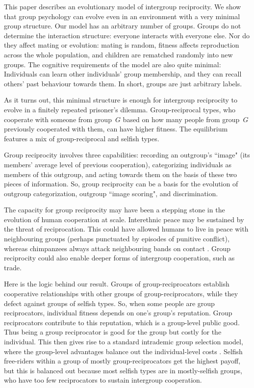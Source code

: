 \documentclass[12pt,a4paper]{article}
\begin{document}
This paper describes an evolutionary model of intergroup reciprocity. We show that group psychology can evolve even in an environment with a very minimal group structure. Our model has an arbitrary number of groups. Groups do not determine the interaction structure: everyone interacts with everyone else. Nor do they affect mating or evolution: mating is random, fitness affects reproduction across the whole population, and children are rematched randomly into new groups. The cognitive requirements of the model are also quite minimal: Individuals can learn other individuals' group membership, and they can recall others' past behaviour towards them. In short, groups are just arbitrary labels.

As it turns out, this minimal structure is enough for intergroup reciprocity to evolve in a finitely repeated prisoner's dilemma. Group-reciprocal types, who cooperate with someone from group~$G$ based on how many people from group~$G$ previously cooperated with them, can have higher fitness. The equilibrium features a mix of group-reciprocal and selfish types.

Group reciprocity involves three capabilities: recording an outgroup's ``image" (its members' average level of previous cooperation), categorizing individuals as members of this outgroup, and acting towards them on the basis of these two pieces of information. So, group reciprocity can be a basis for the evolution of outgroup categorization, outgroup ``image scoring", and discrimination. 

The capacity for group reciprocity may have been a stepping stone in the evolution of human cooperation at scale. Interethnic peace may be sustained by the threat of reciprocation. This could have allowed humans to live in peace with neighbouring groups (perhaps punctuated by episodes of punitive conflict), whereas chimpanzees always attack neighbouring bands on contact \parencite{wrangham2012intergroup}. Group reciprocity could also enable deeper forms of intergroup cooperation, such as trade.

Here is the logic behind our result. Groups of group-reciprocators establish cooperative relationships with other groups of group-reciprocators, while they defect against groups of selfish types. So, when some people are group reciprocators, individual fitness depends on one's group's reputation. Group reciprocators contribute to this reputation, which is a group-level public good. Thus being a group reciprocator is good for the group but costly for the individual. This then gives rise to a standard intrademic group selection model, where the group-level advantages balance out the individual-level costs 
\parencite{wilson1983group,wade1978critical}. Selfish free-riders within a group of mostly group-reciprocators get the highest payoff, but this is balanced out because most selfish types are in mostly-selfish groups, who have too few reciprocators to sustain intergroup cooperation.
\end{document}
